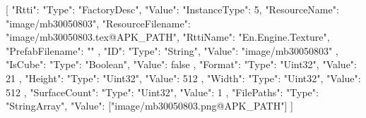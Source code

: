 [{
        "Rtti": {
            "Type": "FactoryDesc",
            "Value": {
                "InstanceType": 5,
                "ResourceName": "image/mb30050803",
                "ResourceFilename": "image/mb30050803.tex@APK_PATH",
                "RttiName": "En.Engine.Texture",
                "PrefabFilename": ""
            }
        },
        "ID": {
            "Type": "String",
            "Value": "image/mb30050803"
        },
        "IsCube": {
            "Type": "Boolean",
            "Value": false
        },
        "Format": {
            "Type": "Uint32",
            "Value": 21
        },
        "Height": {
            "Type": "Uint32",
            "Value": 512
        },
        "Width": {
            "Type": "Uint32",
            "Value": 512
        },
        "SurfaceCount": {
            "Type": "Uint32",
            "Value": 1
        },
        "FilePaths": {
            "Type": "StringArray",
            "Value": ["image/mb30050803.png@APK_PATH"]
        }
    }]